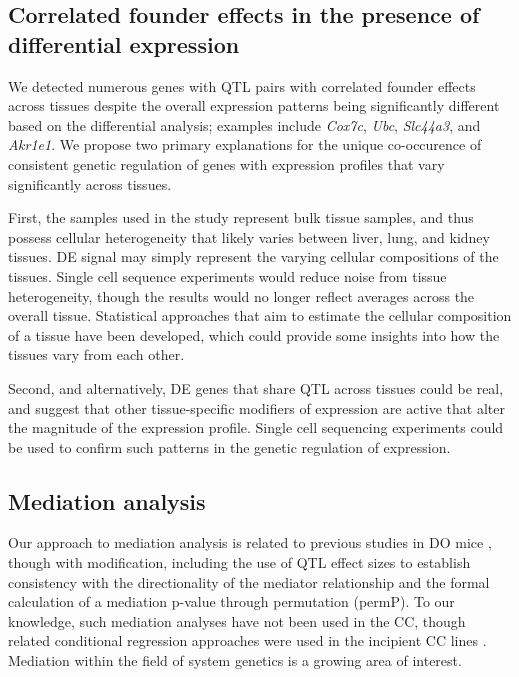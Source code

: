 \documentclass[9pt,twocolumn,twoside]{gsajnl}
\begin{document}
\subsection{Correlated founder effects in the presence of differential expression}

We detected numerous genes with QTL pairs with correlated founder effects across tissues despite the overall expression patterns being significantly different based on the differential analysis; examples include \textit{Cox7c}, \textit{Ubc}, \textit{Slc44a3}, and \textit{Akr1e1}. We propose two primary explanations for the unique co-occurence of consistent genetic regulation of genes with expression profiles that vary significantly across tissues. 

First, the samples used in the study represent bulk tissue samples, and thus possess cellular heterogeneity that likely varies between liver, lung, and kidney tissues. DE signal may simply represent the varying cellular compositions of the tissues. Single cell sequence experiments would reduce noise from tissue heterogeneity, though the results would no longer reflect averages across the overall tissue. Statistical approaches that aim to estimate the cellular composition of a tissue \citep{Aran2017} have been developed, which could provide some insights into how the tissues vary from each other. 

Second, and alternatively, DE genes that share QTL across tissues could be real, and suggest that other tissue-specific modifiers of expression are active that alter the magnitude of the expression profile. Single cell sequencing experiments could be used to confirm such patterns in the genetic regulation of expression.

\subsection{Mediation analysis}

Our approach to mediation analysis is related to previous studies in DO mice \citep{Chick2016,Keller2018,Skelly2019}, though with modification, including the use of QTL effect sizes to establish consistency with the directionality of the mediator relationship and the formal calculation of a mediation p-value through permutation (permP).  To our knowledge, such mediation analyses have not been used in the CC, though related conditional regression approaches were used in the incipient CC lines \citep{Rutledge2014, Kelada2014}. Mediation within the field of system genetics is a growing area of interest.
\end{document}
